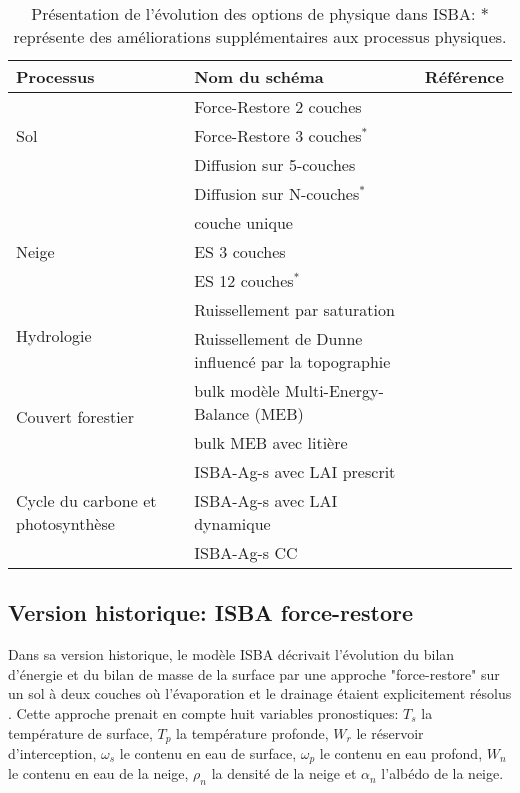 \begin{table}[h!]
 \caption{Présentation de l'évolution des options de physique dans ISBA:  ${\ast}$ représente des améliorations supplémentaires aux processus physiques.}
 \label{schema_isba}
 \begin{tabularx}{\textwidth}{XXX}
 \hline
 Processus & Nom du schéma & Référence\\
 \hline
 \multirow{3}{4cm}{Sol} & Force-Restore 2 couches & \citet{noilhan1989}\\
 & Force-Restore 3 couches$^{\ast}$ & \citet{boone1999}\\
 & Diffusion sur 5-couches & \citet{boone2000}\\
 & Diffusion sur N-couches$^{\ast}$ & \citet{decharme2011}\\
 \hline
 \multirow{3}{4cm}{Neige}& couche unique & \citet{douville1995}\\
 & ES 3 couches &  \citet{boone2001}\\
 & ES 12 couches$^{\ast}$ & \citet{decharme2016}\\
 \hline
 \multirow{2}{4cm}{Hydrologie} & Ruissellement par saturation & \citet{habets1999}\\
 & Ruissellement de Dunne influencé par la topographie &\citet{decharme2007}\\
 \hline
 \multirow{2}{4cm}{Couvert forestier}& bulk modèle Multi-Energy-Balance (MEB) & \citet{boone2017}\\
 & bulk MEB avec litière & \citet{napoly2017}\\
 \hline
 \multirow{3}{4cm}{Cycle du carbone et photosynthèse} & ISBA-Ag-s avec LAI prescrit & \citet{calvet1998}\\
 & ISBA-Ag-s avec LAI dynamique & \citet{calvet2001}\\
 & ISBA-Ag-s CC & \citet{gibelin2008}\\
 \hline
 \end{tabularx}
\end{table}

\subsection{{\selectfont Version historique: ISBA force-restore}}
\label{subsec:ISBA-FR}

Dans sa version historique, le modèle ISBA décrivait l'évolution du bilan d'énergie et du bilan de masse de la surface par une approche "force-restore" \citep[ou "forçage-relaxation"]{deardorff1977} sur un sol à deux couches où l'évaporation et le drainage étaient explicitement résolus \citep{mahfouf1996}. Cette approche prenait en compte huit variables pronostiques: $T_{s}$ la température de surface, $T_{p}$ la température profonde, $W_{r}$ le réservoir d'interception, $\omega_{s}$ le contenu en eau de surface, $\omega_{p}$ le contenu en eau profond, $W_{n}$ le contenu en eau de la neige, $\rho_{n}$ la densité de la neige et $\alpha_{n}$ l'albédo de la neige.\\

